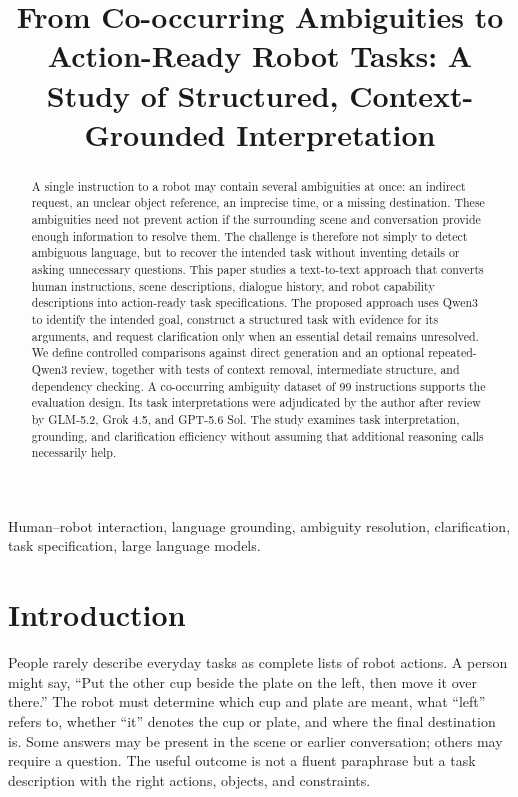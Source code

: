\documentclass[10pt,conference]{IEEEtran}
\title{From Co-occurring Ambiguities to Action-Ready Robot Tasks: A Study of Structured, Context-Grounded Interpretation}
\author{\IEEEauthorblockN{Mohammed Bangie \hspace{0.5em} (Student No. 2610990)}\IEEEauthorblockA{School of Computer Science and Applied Mathematics\\University of the Witwatersrand, Johannesburg, South Africa\\Supervisors: Steven James and Benjamin Rosman}}
\begin{document}
\maketitle\thispagestyle{plain}\pagestyle{plain}
\begin{abstract}
A single instruction to a robot may contain several ambiguities at once: an indirect request, an unclear object reference, an imprecise time, or a missing destination. These ambiguities need not prevent action if the surrounding scene and conversation provide enough information to resolve them. The challenge is therefore not simply to detect ambiguous language, but to recover the intended task without inventing details or asking unnecessary questions. This paper studies a text-to-text approach that converts human instructions, scene descriptions, dialogue history, and robot capability descriptions into action-ready task specifications. The proposed approach uses Qwen3 to identify the intended goal, construct a structured task with evidence for its arguments, and request clarification only when an essential detail remains unresolved. We define controlled comparisons against direct generation and an optional repeated-Qwen3 review, together with tests of context removal, intermediate structure, and dependency checking. A co-occurring ambiguity dataset of 99 instructions supports the evaluation design. Its task interpretations were adjudicated by the author after review by GLM-5.2, Grok 4.5, and GPT-5.6 Sol. The study examines task interpretation, grounding, and clarification efficiency without assuming that additional reasoning calls necessarily help.
\end{abstract}
\begin{IEEEkeywords}
Human--robot interaction, language grounding, ambiguity resolution, clarification, task specification, large language models.
\end{IEEEkeywords}
\section{Introduction}
People rarely describe everyday tasks as complete lists of robot actions. A person might say, ``Put the other cup beside the plate on the left, then move it over there.'' The robot must determine which cup and plate are meant, what ``left'' refers to, whether ``it'' denotes the cup or plate, and where the final destination is. Some answers may be present in the scene or earlier conversation; others may require a question. The useful outcome is not a fluent paraphrase but a task description with the right actions, objects, and constraints.
\end{document}

